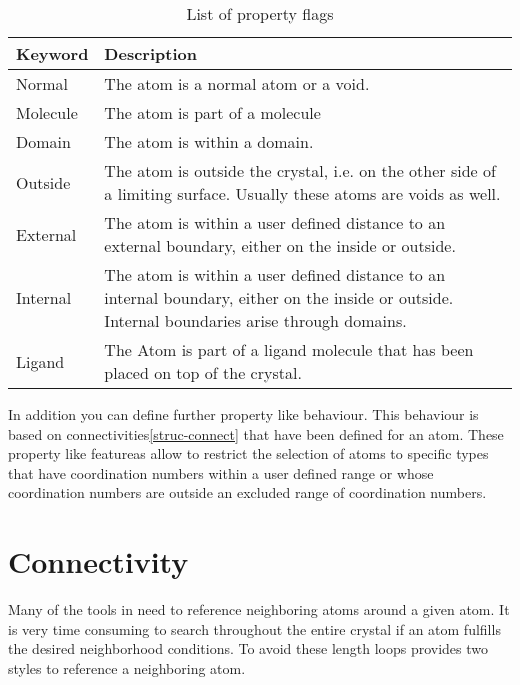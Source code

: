\begin{table}[!tbh]
\centering
\begin{tabularx}{\textwidth}{|p{25mm}|X|}
  \hline
  {\bf Keyword} & {\bf Description} \\
  \hline\hline
  Normal      & The atom is a normal atom or a void.\\
  \hline
  Molecule    & The atom is part of a molecule \\
  \hline
  Domain      & The atom is within a domain. \\
  \hline
  Outside     & The atom is outside the crystal, i.e. on the other
                side of a limiting surface. Usually these atoms are
                voids as well.\\
  \hline
  External    & The atom is within a user defined distance to an 
                external boundary, either on the inside or outside.\\
  \hline
  Internal    & The atom is within a user defined distance to an 
                internal boundary, either on the inside or outside.
                Internal boundaries arise through domains.\\
  \hline
  Ligand      & The Atom is part of a ligand molecule that has been 
                placed on top of the crystal.\\
  \hline
\end{tabularx}
\caption{\label{struc-prp-tab} List of property flags}
\end{table}

In addition you can define further property like behaviour. 
This behaviour is based on connectivities\ref{struc-connect} that have 
been defined for an atom. These property like featureas allow to 
restrict the selection of atoms to specific types that have 
coordination numbers within a user defined range or whose 
coordination numbers are outside an excluded range of coordination
numbers.


\section{Connectivity \label{struc-connect}}

Many of the tools in \Discus need to reference neighboring atoms around
a given atom. It is very time consuming to search throughout the entire
crystal if an atom fulfills the desired neighborhood conditions. To 
avoid these length loops \Discus provides two styles to reference a 
neighboring atom. 

